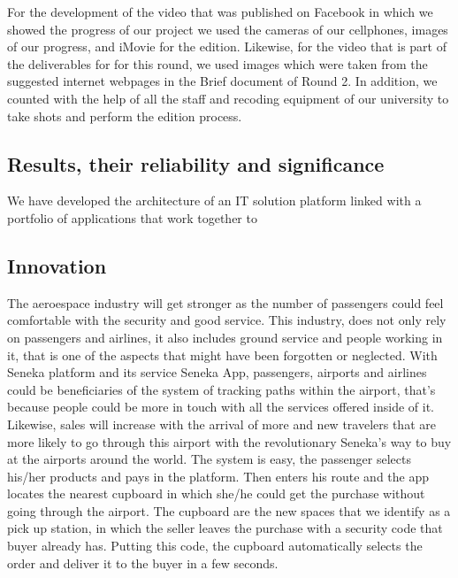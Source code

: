 \documentclass[]{article}
\begin{document}
For the development of the video that was published on Facebook in which we showed the progress of our project we used the cameras of our cellphones, images of our progress, and iMovie for the edition. Likewise, for the video that is part of the deliverables for for this round, we used images which were taken from the suggested internet webpages in the Brief document of Round 2. In addition, we counted with the help of all the staff and recoding equipment of our university to take shots and perform the edition process.\\ 


\subsection{Results, their reliability and significance}

We have developed the architecture of an IT solution platform linked with a portfolio of applications that work together to 

\subsection{Innovation}

The aeroespace industry will get stronger as the number of passengers could feel comfortable with the security and good service. This industry, does not only rely on passengers and airlines, it also includes ground service and people working in it, that is one of the aspects that might have been forgotten or neglected. With Seneka platform and its service Seneka App, passengers, airports and airlines could be beneficiaries of the system of tracking paths within the airport, that's because people could be more in touch with all the services offered inside of it.\\

Likewise, sales will increase with the arrival of more and new travelers that are more likely to go through this airport with the revolutionary Seneka's way to buy at the airports around the world. The system is easy, the passenger selects his/her products and pays in the platform. Then enters his route and the app locates the nearest cupboard in which she/he could get the purchase without going through the airport. The cupboard are the new spaces that we identify as a pick up station, in which the seller leaves the purchase with a security code that buyer already has. Putting this code, the cupboard automatically selects the order and deliver it to the buyer in a few seconds.\\
\end{document}
